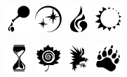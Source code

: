 \vspace*{2.5cm}
\begin{center}
\includegraphics[width=1cm]{pics/alchemy.png}\hspace{0.2cm}%
\includegraphics[width=1cm]{pics/heavens.png}\hspace{0.2cm}%
\includegraphics[width=1cm]{pics/fire.png}\hspace{0.2cm}%
\includegraphics[width=1cm]{pics/light.png}%
\end{center}

\begin{center}
\includegraphics[width=1cm]{pics/death.png}\hspace{0.2cm}%
\includegraphics[width=1cm]{pics/nature.png}\hspace{0.2cm}%
\includegraphics[width=1cm]{pics/shadows.png}\hspace{0.2cm}%
\includegraphics[width=1cm]{pics/wilderness.png}%
\end{center}







\normalfontsize



